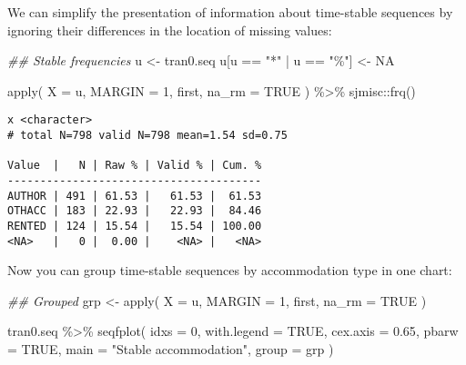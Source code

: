 \documentclass[
  letterpaper,
  DIV=11,
  numbers=noendperiod]{scrreprt}
\newenvironment{Shaded}{\begin{snugshade}}{\end{snugshade}}
\newcommand{\AttributeTok}[1]{\textcolor[rgb]{0.40,0.45,0.13}{#1}}
\newcommand{\ConstantTok}[1]{\textcolor[rgb]{0.56,0.35,0.01}{#1}}
\newcommand{\DecValTok}[1]{\textcolor[rgb]{0.68,0.00,0.00}{#1}}
\newcommand{\DocumentationTok}[1]{\textcolor[rgb]{0.37,0.37,0.37}{\textit{#1}}}
\newcommand{\FloatTok}[1]{\textcolor[rgb]{0.68,0.00,0.00}{#1}}
\newcommand{\FunctionTok}[1]{\textcolor[rgb]{0.28,0.35,0.67}{#1}}
\newcommand{\NormalTok}[1]{\textcolor[rgb]{0.00,0.23,0.31}{#1}}
\newcommand{\OtherTok}[1]{\textcolor[rgb]{0.00,0.23,0.31}{#1}}
\newcommand{\SpecialCharTok}[1]{\textcolor[rgb]{0.37,0.37,0.37}{#1}}
\newcommand{\StringTok}[1]{\textcolor[rgb]{0.13,0.47,0.30}{#1}}
\begin{document}
We can simplify the presentation of information about time-stable
sequences by ignoring their differences in the location of missing
values:

\begin{Shaded}
\begin{Highlighting}[]
\DocumentationTok{\#\# Stable frequencies}
\NormalTok{u }\OtherTok{\textless{}{-}}\NormalTok{ tran0.seq}
\NormalTok{u[u }\SpecialCharTok{==} \StringTok{"*"} \SpecialCharTok{|}\NormalTok{ u }\SpecialCharTok{==} \StringTok{"\%"}\NormalTok{] }\OtherTok{\textless{}{-}} \ConstantTok{NA}

\FunctionTok{apply}\NormalTok{(}
  \AttributeTok{X =}\NormalTok{ u, }\AttributeTok{MARGIN =} \DecValTok{1}\NormalTok{, first, }\AttributeTok{na\_rm =} \ConstantTok{TRUE}
\NormalTok{) }\SpecialCharTok{\%\textgreater{}\%}\NormalTok{ sjmisc}\SpecialCharTok{::}\FunctionTok{frq}\NormalTok{()}
\end{Highlighting}
\end{Shaded}

\begin{verbatim}
x <character> 
# total N=798 valid N=798 mean=1.54 sd=0.75

Value  |   N | Raw % | Valid % | Cum. %
---------------------------------------
AUTHOR | 491 | 61.53 |   61.53 |  61.53
OTHACC | 183 | 22.93 |   22.93 |  84.46
RENTED | 124 | 15.54 |   15.54 | 100.00
<NA>   |   0 |  0.00 |    <NA> |   <NA>
\end{verbatim}

Now you can group time-stable sequences by accommodation type in one
chart:

\begin{Shaded}
\begin{Highlighting}[]
\DocumentationTok{\#\# Grouped}
\NormalTok{grp }\OtherTok{\textless{}{-}} \FunctionTok{apply}\NormalTok{(}
  \AttributeTok{X =}\NormalTok{ u, }\AttributeTok{MARGIN =} \DecValTok{1}\NormalTok{, first, }\AttributeTok{na\_rm =} \ConstantTok{TRUE}
\NormalTok{)}

\NormalTok{tran0.seq }\SpecialCharTok{\%\textgreater{}\%} 
  \FunctionTok{seqfplot}\NormalTok{(}
    \AttributeTok{idxs =} \DecValTok{0}\NormalTok{,}
    \AttributeTok{with.legend =} \ConstantTok{TRUE}\NormalTok{, }\AttributeTok{cex.axis =} \FloatTok{0.65}\NormalTok{, }\AttributeTok{pbarw =} \ConstantTok{TRUE}\NormalTok{,}
    \AttributeTok{main =} \StringTok{"Stable accommodation"}\NormalTok{,}
    \AttributeTok{group =}\NormalTok{ grp}
\NormalTok{  )}
\end{Highlighting}
\end{Shaded}
\end{document}
